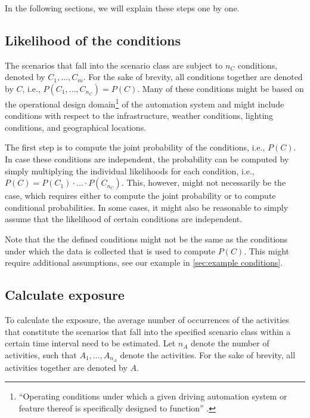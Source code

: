 In the following sections, we will explain these steps one by one. 



\subsection{Likelihood of the conditions}
\label{sec:conditions}

The scenarios that fall into the scenario class are subject to $n_C$ conditions, denoted by $C_1, \ldots, C_m$. For the sake of brevity, all conditions together are denoted by $C$, i.e., $P(C_1, \ldots, C_{n_C})=P(C)$. Many of these conditions might be based on the operational design domain\footnote{``Operating conditions under which a given driving automation system or feature thereof is specifically designed to function'' \cite{sea2018j3016}.} of the automation system and might include conditions with respect to the infrastructure, weather conditions, lighting conditions, and geographical locations. 

The first step is to compute the joint probability of the conditions, i.e., $P(C)$. In case these conditions are independent, the probability can be computed by simply multiplying the individual likelihoods for each condition, i.e., $P(C)=P(C_1)\cdot\ldots\cdot P(C_{n_C})$. This, however, might not necessarily be the case, which requires either to compute the joint probability or to compute conditional probabilities. In some cases, it might also be reasonable to simply assume that the likelihood of certain conditions are independent.

Note that the the defined conditions might not be the same as the conditions under which the data is collected that is used to compute $P(C)$. This might require additional assumptions, see our example in \cref{sec:example conditions}.



\subsection{Calculate exposure}
\label{sec:exposure}

To calculate the exposure, the average number of occurrences of the activities that constitute the scenarios that fall into the specified scenario class within a certain time interval need to be estimated. Let $n_A$ denote the number of activities, such that $A_1, \ldots, A_{n_A}$ denote the activities. For the sake of brevity, all activities together are denoted by $A$. 

